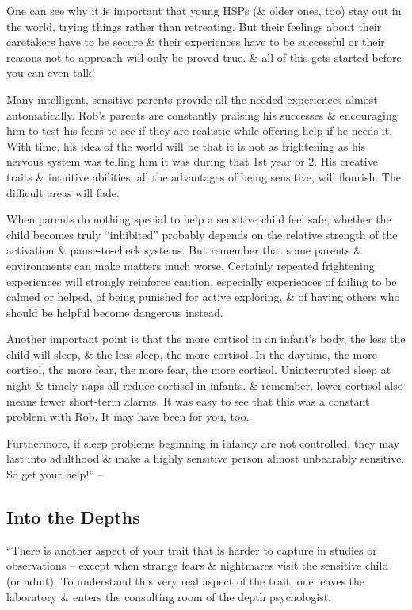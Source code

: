 \documentclass{article}
\numberwithin{equation}{section}
\begin{document}
One can see why it is important that young HSPs (\& older ones, too) stay out in the world, trying things rather than retreating. But their feelings about their caretakers have to be secure \& their experiences have to be successful or their reasons not to approach will only be proved true. \& all of this gets started before you can even talk!

Many intelligent, sensitive parents provide all the needed experiences almost automatically. Rob's parents are constantly praising his successes \& encouraging him to test his fears to see if they are realistic while offering help if he needs it. With time, his idea of the world will be that it is not as frightening as his nervous system was telling him it was during that 1st year or 2. His creative traits \& intuitive abilities, all the advantages of being sensitive, will flourish. The difficult areas will fade.

When parents do nothing special to help a sensitive child feel safe, whether the child becomes truly ``inhibited'' probably depends on the relative strength of the activation \& pause-to-check systems. But remember that some parents \& environments can make matters much worse. Certainly repeated frightening experiences will strongly reinforce caution, especially experiences of failing to be calmed or helped, of being punished for active exploring, \& of having others who should be helpful become dangerous instead.

Another important point is that the more cortisol in an infant's body, the less the child will sleep, \& the less sleep, the more cortisol. In the daytime, the more cortisol, the more fear, the more fear, the more cortisol. Uninterrupted sleep at night \& timely naps all reduce cortisol in infants. \& remember, lower cortisol also means fewer short-term alarms. It was easy to see that this was a constant problem with Rob. It may have been for you, too.

Furthermore, if sleep problems beginning in infancy are not controlled, they may last into adulthood \& make a highly sensitive person almost unbearably sensitive. So get your help!'' -- \cite[pp. 67--70]{Aron2013}

\subsection{Into the Depths}
``There is another aspect of your trait that is harder to capture in studies or observations -- except when strange fears \& nightmares visit the sensitive child (or adult). To understand this very real aspect of the trait, one leaves the laboratory \& enters the consulting room of the depth psychologist.
\end{document}
